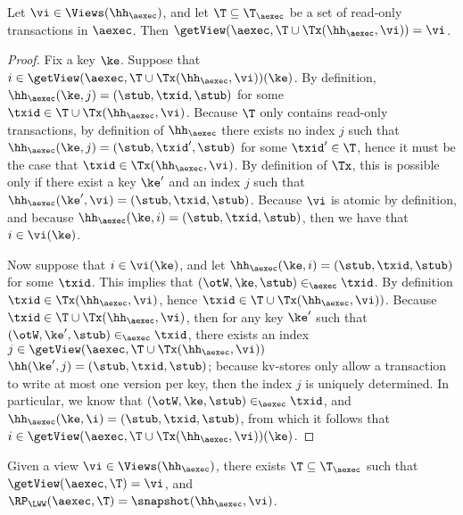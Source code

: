 \begin{proposition}
\label{prop:getview.tx}
Let $\vi \in \Views(\hh_{\aexec})$, and let $\T \subseteq \T_{\aexec}$ be a 
set of read-only transactions in $\aexec$. Then 
$\getView(\aexec, \T \cup \Tx(\hh_{\aexec}, \vi)) = \vi$. 
\end{proposition}

\begin{proof}
Fix a key $\ke$. Suppose that $i \in \getView(\aexec, \T \cup \Tx(\hh_{\aexec}, \vi))(\ke)$. 
By definition, $\hh_{\aexec}(\ke, j) = (\stub, \txid, \stub)$ for some $\txid \in \T \cup \Tx(\hh_{\aexec}, \vi)$. 
Because $\T$ only contains read-only transactions, by definition of $\hh_{\aexec}$ there exists 
no index $j$ such that $\hh_{\aexec}(\ke, j) = (\stub, \txid', \stub)$ for some $\txid' \in \T$, 
hence it must be the case that $\txid \in \Tx(\hh_{\aexec}, \vi)$. By definition of $\Tx$, 
this is possible only if there exist a key $\ke'$ and an index $j$ such that $\hh_{\aexec}(\ke', \vi) = (\stub, \txid, \stub)$. 
Because $\vi$ is atomic by definition, and because $\hh_{\aexec}(\ke, i) = (\stub, \txid, \stub)$, then we have that $i \in \vi(\ke)$. 

Now suppose that $i \in \vi(\ke)$, and let $\hh_{\aexec}(\ke, i) = (\stub, \txid, \stub)$ for some $\txid$. 
This implies that $(\otW, \ke, \stub) \in_{\aexec} \txid$.
By definition $\txid \in \Tx(\hh_{\aexec}, \vi)$, hence $\txid \in \T \cup \Tx(\hh_{\aexec}, \vi))$. 
Because $\txid \in \T \cup \Tx(\hh_{\aexec}, \vi)$, then for any key $\ke'$ such that 
$(\otW, \ke', \stub) \in_{\aexec} \txid$, there exists an index $j \in \getView(\aexec, \T \cup \Tx(\hh_{\aexec}, \vi))$ 
$\hh(\ke', j) = (\stub, \txid, \stub)$; because kv-stores only allow a transaction to write at most one version 
per key, then the index $j$ is uniquely determined. In particular, we know that $(\otW, \ke, \stub) \in_{\aexec} \txid$, 
and $\hh_{\aexec}(\ke, \i) = (\stub, \txid, \stub)$, from which it follows that $i \in \getView(\aexec, \T \cup \Tx(\hh_{\aexec}, \vi))(\ke)$.
\end{proof}


\begin{proposition}
\label{prop:compatible.kv2aexec}
Given a view $\vi \in \Views(\hh_{\aexec})$, there exists $\T \subseteq \T_{\aexec}$ 
such that $\getView(\aexec, \T) = \vi$, and $\RP_{\LWW}(\aexec, \T) = \snapshot(\hh_{\aexec}, \vi)$.
\end{proposition}

